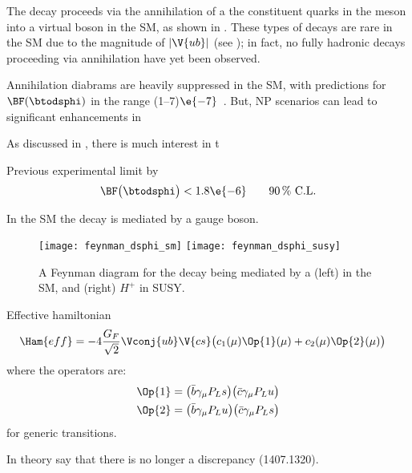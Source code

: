 The decay \btodsphi proceeds via the annihilation of a the constituent quarks in the \Bp meson into
a virtual \Wp boson in the SM, as shown in .
These types of decays are rare in the SM due to the magnitude of $|\V{ub}|$ (see );
in fact, no fully hadronic decays proceeding via annihilation have yet been observed.

Annihilation diabrams are heavily suppressed in the SM, with predictions for $\BF(\btodsphi)$ in
the range (1--7)$\e{-7}$~\cite{Zou:2009zza,Mohanta:2002wf,PhysRevD.76.057701,Lu:2001yz}.
But, NP scenarios can lead to significant enhancements in

As discussed in , there is much interest in t

Previous experimental limit by \babar \cite{Aubert:2005gd}
\begin{equation}
  \BF\big(\btodsphi\big) < 1.8\e{-6} \qquad \text{90\,\% C.L.}
\end{equation}


In the SM the decay is mediated by a \Wp gauge boson.

\begin{figure}
  \begin{center}
    \texttt{[image: feynman\_dsphi\_sm]}
    \texttt{[image: feynman\_dsphi\_susy]}
    \caption[Feynman diagram for the decay \btodsphi]
    {\small
      A Feynman diagram for the decay \btodsphi being mediated by a
      (left) \Wp in the SM, and
      (right) $H^+$ in SUSY.
    }
    \label{fig:dsphi:feyn}
  \end{center}
\end{figure}



Effective hamiltonian
\begin{align}
  \Ham{eff} &= -4\frac{G_F}{\sqrt{2}}\Vconj{ub}\V{cs}
  \big(
  c_1(\mu)\Op{1}(\mu) + c_2(\mu)\Op{2}(\mu)
  \big)
\end{align}
where the operators are:
\begin{align}
  \Op{1} &= \big(\bar b\gamma_\mu P_Ls\big) \big(\bar c\gamma_\mu P_Lu\big) \nonumber\\
  \Op{2} &= \big(\bar b\gamma_\mu P_Lu\big) \big(\bar c\gamma_\mu P_Ls\big)
\end{align}
\cite{Buchalla:1995vs}
for generic  transitions.

























In theory say that there is no longer a discrepancy (1407.1320).
\cite{PDG2012}
